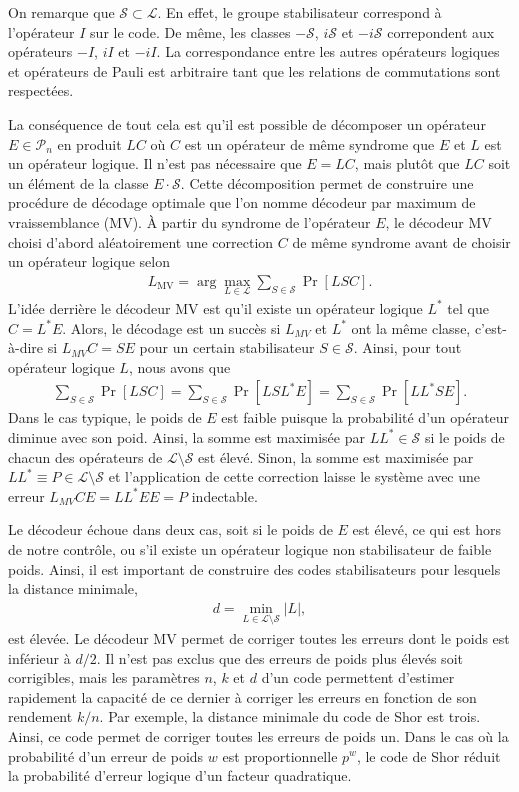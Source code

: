 On remarque que $\mathcal S \subset \mathcal L$.
En effet, le groupe stabilisateur correspond à l'opérateur $I$ sur le code.
De même, les classes $-\mathcal S$, $i\mathcal S$ et $-i\mathcal S$ correpondent
aux opérateurs $-I$, $iI$ et $-iI$.
La correspondance entre les autres opérateurs logiques et opérateurs de Pauli est
arbitraire tant que les relations de commutations sont respectées.

La conséquence de tout cela est qu'il est possible de décomposer un opérateur
$E \in \mathcal P_n$ en produit $LC$ où $C$ est un opérateur de même syndrome que $E$
et $L$ est un opérateur logique.
Il n'est pas nécessaire que $E = LC$, mais plutôt que $LC$ soit un élément de la classe $E \cdot \mathcal S$.
Cette décomposition permet de construire une procédure de décodage optimale que l'on 
nomme décodeur par maximum de vraissemblance (MV).
À partir du syndrome de l'opérateur $E$, 
le décodeur MV choisi d'abord aléatoirement une correction $C$ de même syndrome avant
de choisir un opérateur logique selon
\begin{align}
  L_{\text{MV}} = \arg\max_{L \in \mathcal L} \sum_{S \in \mathcal S} \Pr[LSC].
\end{align}
L'idée derrière le décodeur MV est qu'il existe un opérateur logique $L^*$ tel que $C = L^*E$.
Alors, le décodage est un succès si $L_{MV}$ et $L^*$ ont la même classe,
c'est-à-dire si $L_{MV}C = SE$ pour un certain stabilisateur $S \in \mathcal S$.
Ainsi, pour tout opérateur logique $L$, nous avons que 
\begin{align}
  \sum_{S\in \mathcal S} \Pr[LSC]
  =
  \sum_{S\in \mathcal S} \Pr[LSL^*E]
  =
  \sum_{S\in \mathcal S} \Pr[LL^*SE].
\end{align}
Dans le cas typique,
le poids de $E$ est faible puisque la probabilité d'un opérateur diminue avec son poid.
Ainsi, la somme est maximisée par $LL^* \in \mathcal S$ si le poids de chacun des opérateurs de
$\mathcal L \setminus \mathcal S$ est élevé.
Sinon,
la somme est maximisée par $LL^* \equiv P \in \mathcal L \setminus \mathcal S$ 
et l'application de cette correction laisse le système avec une erreur $L_{MV}CE = LL^*EE = P$ indectable.

Le décodeur échoue dans deux cas,
soit si le poids de $E$ est élevé, ce qui est hors de notre contrôle,
ou s'il existe un opérateur logique non stabilisateur de faible poids.
Ainsi,
il est important de construire des codes stabilisateurs pour lesquels la distance minimale,
\begin{align}
  d = \min_{L \in \mathcal L \setminus \mathcal S} |L|,
\end{align}
est élevée.
Le décodeur MV permet de corriger toutes les erreurs dont le poids est inférieur à $d / 2$.
Il n'est pas exclus que des erreurs de poids plus élevés soit corrigibles, 
mais les paramètres $n$, $k$ et $d$ d'un code permettent d'estimer rapidement la capacité
de ce dernier à corriger les erreurs en fonction de son rendement $k/n$.
Par exemple,
la distance minimale du code de Shor est trois.
Ainsi, ce code permet de corriger toutes les erreurs de poids un.
Dans le cas où la probabilité d'un erreur de poids $w$ est proportionnelle $p^w$,
le code de Shor réduit la probabilité d'erreur logique d'un facteur quadratique.

